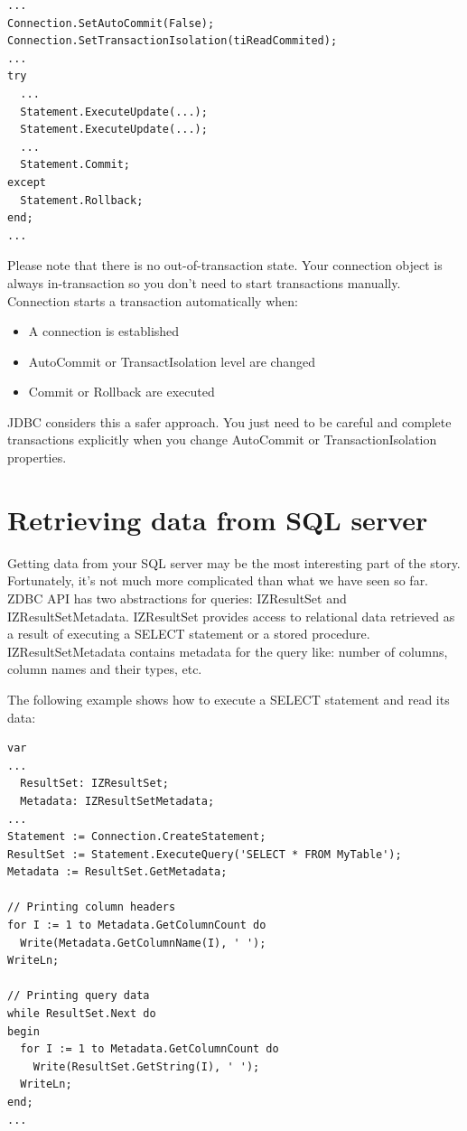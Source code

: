 \documentclass[a4paper,12pt,oneside]{book}
\begin{document}
\begin{verbatim}
...
Connection.SetAutoCommit(False);
Connection.SetTransactionIsolation(tiReadCommited);
...
try
  ...
  Statement.ExecuteUpdate(...);
  Statement.ExecuteUpdate(...);
  ...
  Statement.Commit;
except
  Statement.Rollback;
end;
...
\end{verbatim}

Please note that there is no out-of-transaction state.
Your connection object is always in-transaction so you don't need to start transactions manually.
Connection starts a transaction automatically when:
\begin{itemize}
  \item A connection is established
  \item AutoCommit or TransactIsolation level are changed
  \item Commit or Rollback are executed
\end{itemize}

JDBC considers this a safer approach.
You just need to be careful and complete transactions explicitly when you change AutoCommit or TransactionIsolation properties. 

\section{Retrieving data from SQL server}

Getting data from your SQL server may be the most interesting part of the story. Fortunately, it's not much more complicated than what we have seen so far. ZDBC API has two abstractions for queries: IZResultSet and IZResultSetMetadata. IZResultSet provides access to relational data retrieved as a result of executing a SELECT statement or a stored procedure. IZResultSetMetadata contains metadata for the query like: number of columns, column names and their types, etc.

The following example shows how to execute a SELECT statement and read its data:

\begin{verbatim}
var
...
  ResultSet: IZResultSet;
  Metadata: IZResultSetMetadata;
...
Statement := Connection.CreateStatement;
ResultSet := Statement.ExecuteQuery('SELECT * FROM MyTable');
Metadata := ResultSet.GetMetadata;

// Printing column headers
for I := 1 to Metadata.GetColumnCount do
  Write(Metadata.GetColumnName(I), ' ');
WriteLn;

// Printing query data
while ResultSet.Next do
begin
  for I := 1 to Metadata.GetColumnCount do
    Write(ResultSet.GetString(I), ' ');
  WriteLn;
end;
...
\end{verbatim}
\end{document}
